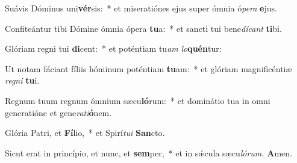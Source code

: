 \item Suávis Dóminus uni\textbf{vér}sis:~* et miseratiónes ejus super ómnia ó\textit{pera} \textbf{e}jus.
\item Confiteántur tibi Dómine ómnia ópera \textbf{tu}a:~* et sancti tui bene\tinyhspace\textit{dícant} \textbf{ti}bi.
\item Glóriam regni tui \textbf{di}cent:~* et poténtiam tu\tinyhspace\textit{am} \textit{lo}\textbf{quén}tur:
\item Ut notam fáciant fíliis hóminum poténtiam \textbf{tu}am:~* et glóriam magnificéntiæ \textit{regni} \textbf{tu}i.
\item Regnum tuum regnum ó\-mnium sæcu\textbf{ló}rum:~* et dominátio tua in omni generatióne et gene\tinyhspace\textit{rati}\textbf{ó}nem.
\item Glória Patri, et \textbf{Fí}lio,~* et Spirí\tinyhspace\textit{tui} \textbf{San}cto.
\item Sicut erat in princípio, et nunc, et \textbf{sem}per,~* et in sǽcula sæcu\tinyhspace\textit{lórum.} \textbf{A}men.